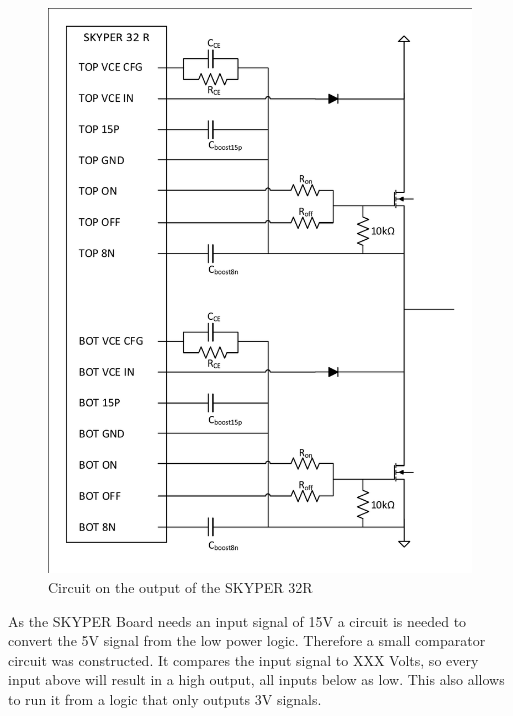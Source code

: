 \begin{figure}[H]
   \centering
   \includegraphics[width=\textwidth]{figures/Skyperboard/Skyper32out.pdf}
    \caption{Circuit on the output of the SKYPER 32R}
	\label{fig:ConventionalBoostONN}
\end{figure}


As the SKYPER Board needs an input signal of 15V a circuit is needed to convert the 5V signal from the low power logic.
Therefore a small comparator circuit was constructed.
It compares the input signal to XXX Volts, so every input above will result in a high output,
all inputs below as low.
This also allows to run it from a logic that only outputs 3V signals.